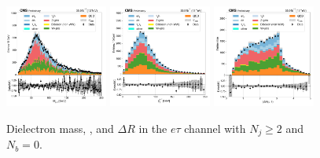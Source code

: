 \begin{figure}[htb!]
    \centering
    \includegraphics[width=0.3\textwidth]{chapters/Appendix/sectionPlots/figures/data_mc_overlays/etau_2016_cat_gt2_eq0_signal_linear_lepton_dilepton1_mass}
    \includegraphics[width=0.3\textwidth]{chapters/Appendix/sectionPlots/figures/data_mc_overlays/etau_2016_cat_gt2_eq0_signal_linear_lepton_dilepton1_pt}
    \includegraphics[width=0.3\textwidth]{chapters/Appendix/sectionPlots/figures/data_mc_overlays/etau_2016_cat_gt2_eq0_signal_linear_lepton_dilepton1_delta_r}
    \caption{Dielectron mass, \pt, and $\Delta R$ in the $e\tau$ channel
    with $N_{j} \geq 2$ and $N_{b} = 0$.}
    \label{fig:etau_4_dilepton}
\end{figure}

